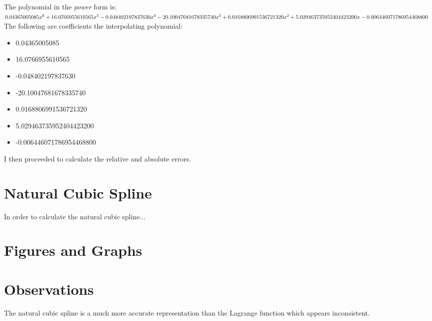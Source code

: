 \documentclass{article}
\begin{document}
The polynomial in the {\it power} form is: \\

$0.04365005085x^6 + 16.0766955610565x^5 - 0.048402197837630x^4 - 20.10047681678335740x^3\\ + 0.0168806991536721320x^2 + 5.029463735952404423200x - 0.006446071786954468800$ \\

The following are coefficients the interpolating polynomial:
 \begin{itemize}
  \item 0.04365005085
  \item 16.0766955610565
  \item -0.048402197837630
  \item -20.10047681678335740
  \item 0.0168806991536721320
  \item 5.029463735952404423200
  \item -0.006446071786954468800
  \end{itemize}

I then proceeded to calculate the relative and absolute errors.

\section{Natural Cubic Spline}
In order to calculate the natural cubic spline...

\section{Figures and Graphs}

\section{Observations}
The natural cubic spline is a much more accurate representation than the Lagrange function which appears inconsistent.  
\end{document}
